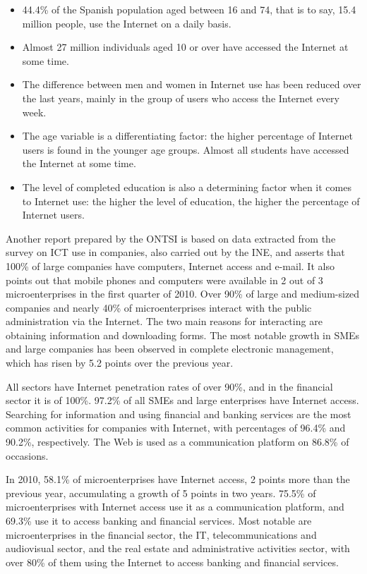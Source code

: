 \begin{multicols}{2}
\begin{itemize}
  \item 44.4\% of the Spanish population aged between 16 and 74, that is to say, 15.4 million people, use the Internet on a daily basis.
  \item Almost 27 million individuals aged 10 or over have accessed the Internet at some time.
  \item The difference between men and women in Internet use has been reduced over the last years, mainly in the group of users who access the Internet every week.
  \item The age variable is a differentiating factor: the higher percentage of Internet users is found in the younger age groups. Almost all students have accessed the Internet at some time.
  \item The level of completed education is also a determining factor when it comes to Internet use: the higher the level of education, the higher the percentage of Internet users.
\end{itemize}

Another report prepared by the ONTSI is based on data extracted from the survey on ICT use in companies, also carried out by the INE, and asserts that 100\% of large companies have computers, Internet access and e-mail. It also points out that mobile phones and computers were available in 2 out of 3 microenterprises in the first quarter of 2010. Over 90\% of large and medium-sized companies and nearly 40\% of microenterprises interact with the public administration via the Internet. The two main reasons for interacting are obtaining information and downloading forms. The most notable growth in SMEs and large companies has been observed in complete electronic management, which has risen by 5.2 points over the previous year.


All sectors have Internet penetration rates of over 90\%, and in the financial sector it is of 100\%. 97.2\% of all SMEs and large enterprises have Internet access. Searching for information and using financial and banking services are the most common activities for companies with Internet, with percentages of 96.4\% and 90.2\%, respectively. The Web is used as a communication platform on 86.8\% of occasions.

In 2010, 58.1\% of microenterprises have Internet access, 2 points more than the previous year, accumulating a growth of 5 points in two years. 75.5\% of microenterprises with Internet access use it as a communication platform, and 69.3\% use it to access banking and financial services. Most notable are microenterprises in the financial sector, the IT, telecommunications and audiovisual sector, and the real estate and administrative activities sector, with over 80\% of them using the Internet to access banking and financial services.


\end{multicols}
